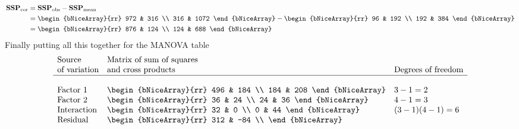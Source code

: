 \begin{enumerate}[label= (\alph*)]
    \begin{align*}
        \textbf{SSP}_{\text{cor}}
        & =
        \textbf{SSP}_{\text{obs}}
        -
        \textbf{SSP}_{\text{mean}}
        \\
        & =
        \begin{bNiceArray}{rr}
            972 &  316 \\
            316 & 1072
        \end{bNiceArray}
        -
        \begin{bNiceArray}{rr}
             96 & 192  \\
            192 & 384
        \end{bNiceArray}
        \\
        & =
        \begin{bNiceArray}{rr}
            876 & 124 \\
            124 & 688
        \end{bNiceArray}
    \end{align*}
    Finally putting all this together for the MANOVA table
    \[
    \begin{array}{lll}
        \text{Source} & \text{Matrix of sum of squares} & \\
        \text{of variation} & \text{and cross products} & \text{Degrees of freedom} \\
        \hline \\
        \text{Factor 1}
        &
        \begin{bNiceArray}{rr}
            496 & 184 \\
            184 & 208
        \end{bNiceArray}
        &
        3 - 1 = 2
        \\
        \text{Factor 2}
        &
        \begin{bNiceArray}{rr}
            36 & 24 \\
            24 & 36
        \end{bNiceArray}
        &
         4 - 1 = 3
        \\
        \text{Interaction}
        &
        \begin{bNiceArray}{rr}
            32 &  0 \\
             0 & 44
        \end{bNiceArray}
        &
        (3-1)(4-1) = 6
        \\
        \text{Residual}
        &
        \begin{bNiceArray}{rr}
            312 & -84 \\

\end{bNiceArray}
\end{array}\]
\end{enumerate}
